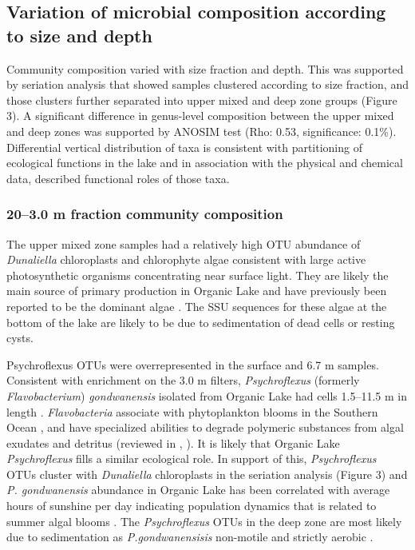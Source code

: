 \subsection{Variation of microbial composition according to size and depth}
Community composition varied with size fraction and depth. 
This was supported by seriation analysis that showed samples clustered according to size fraction, and those clusters further separated into upper mixed and deep zone groups (Figure 3). 
A significant difference in genus-level composition between the upper mixed and deep zones was supported by \ac{ANOSIM} test (Rho: 0.53, significance: 0.1\%). 
Differential vertical distribution of taxa is consistent with partitioning of ecological functions in the lake and in association with the physical and chemical data, described functional roles of those taxa.

\subsubsection{20--3.0 \textmu{}m fraction community composition}
The upper mixed zone samples had a relatively high \ac{OTU} abundance of \emph{Dunaliella} chloroplasts and chlorophyte algae consistent with large active photosynthetic organisms concentrating near surface light. 
They are likely the main source of primary production in Organic Lake and have previously been reported to be the dominant algae \cite{Franzmann1987b}. 
The \ac{SSU} sequences for these algae at the bottom of the lake are likely to be due to sedimentation of dead cells or resting cysts.

Psychroflexus \acp{OTU} were overrepresented in the surface and 6.7 m samples. 
Consistent with enrichment on the 3.0 \textmu{}m filters, \emph{Psychroflexus} (formerly \emph{Flavobacterium}) \emph{gondwanensis} \cite{Bowman1998} isolated from Organic Lake \cite{Franzmann1987b} had cells 1.5--11.5 \textmu{}m in length \cite{Dobson1991}. 
\emph{Flavobacteria} associate with phytoplankton blooms in the Southern Ocean \cite{Abell2005a, Abell2005b, Williams2012}, and have specialized abilities to degrade polymeric substances from algal exudates and detritus (reviewed in \citet{Kirchman2002}, \cite{Williams2012}). 
It is likely that Organic Lake \emph{Psychroflexus} fills a similar ecological role. 
In support of this, \emph{Psychroflexus} \acp{OTU} cluster with \emph{Dunaliella} chloroplasts in the seriation analysis (Figure 3) and \emph{P. gondwanensis} abundance in Organic Lake has been correlated with average hours of sunshine per day indicating population dynamics that is related to summer algal blooms \cite{James1994}. 
The \emph{Psychroflexus} \acp{OTU} in the deep zone are most likely due to sedimentation as \emph{P.gondwanensisis} non-motile and strictly aerobic \cite{Dobson1991}.

